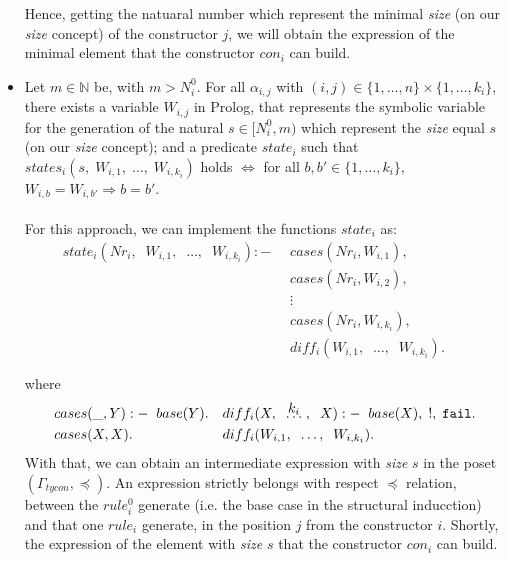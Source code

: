 \documentclass{report}
\theoremstyle{definition}
\theoremstyle{definition}
\newcommand{\ttt}[1]{\texttt{#1}}
\newcommand{\tav}{\;\;}
\newcommand{\kldots}[1]{\stackrel{\mathclap{\normalfont\mbox{#1}}}{\ldots}}
\begin{document}
\begin{itemize}
	Hence, getting the natuaral number which represent the minimal \textit{size} (on our \textit{size} concept) of the constructor $j$, we will obtain the expression of the minimal element that the constructor $con_i$ can build.
	\item Let $m \in \mathbb{N}$ be, with $m > N_{i}^{0}$. For all $\alpha_{i,j}$ with $(i,j) \in \{1, \ldots, n \} \times \{1, \ldots, k_i \}$, there exists a variable $W_{i,j}$ in Prolog, that represents the symbolic variable for the generation of the natural $s \in [N_{i}^{0}, m )$ which represent the \textit{size} equal $s$ (on our \textit{size} concept); and a predicate $state_{i}$ such that $states_i(s, \; W_{i,1}, \; \ldots, \; W_{i,k_i})$ holds $\Longleftrightarrow $ for all $b,b' \in \{1, \ldots, k_i \}$,  $W_{i,b}=W_{i,b'} \Rightarrow b = b'$.\\\\
	For this approach, we can implement the functions $state_i$ as:
	\begin{align*}
		state_i(Nr_i, \tav W_{i,1}, \tav \ldots, \tav W_{i, k_i}) :-
		& \tav cases(Nr_i, W_{i,1}), && \\
		& \tav cases(Nr_i, W_{i,2}), && \\
		& \tav \vdots && \\
		& \tav cases(Nr_i, W_{i,k_i}), && \\
		& \tav diff_i(W_{i,1}, \tav \ldots, \tav W_{i, k_i}). && \\\\
	\end{align*}
	where
	\begin{align*}
		&cases(\_, Y) :- \tav base(Y). &&diff_i(X, \tav \kldots{$k_i$}\;, \tav X) :- \tav base(X), \; !, \; \ttt{fail}. \\
		&cases(X, X). &&diff_i(W_{i,1}, \tav \ldots, \tav W_{i, k_i}).
	\end{align*}
	With that, we can obtain an intermediate expression with \textit{size} $s$ in the poset $(\Gamma_{tycon}, \preceq)$. An expression strictly belongs with respect $\preceq$ relation, between the $rule_{i}^{0}$ generate (i.e. the base case in the structural inducction) and that one $rule_i$ generate, in the position $j$ from the constructor $i$. Shortly, the expression of the element with \textit{size} $s$ that the constructor $con_i$ can build.
\end{itemize}
\end{document}
